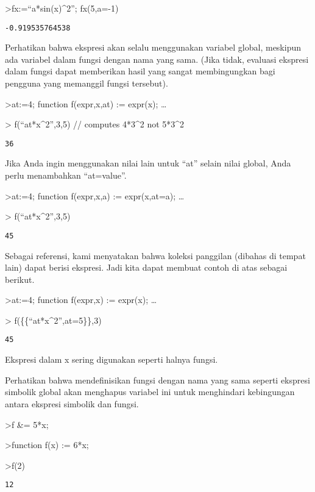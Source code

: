 \documentclass[
]{book}
\begin{document}
\textgreater fx:=``a*sin(x)\^{}2''; fx(5,a=-1)

\begin{verbatim}
-0.919535764538
\end{verbatim}

Perhatikan bahwa ekspresi akan selalu menggunakan variabel global, meskipun ada variabel dalam fungsi dengan nama yang sama. (Jika tidak, evaluasi ekspresi dalam fungsi dapat memberikan hasil yang sangat membingungkan bagi pengguna yang memanggil fungsi tersebut).

\textgreater at:=4; function f(expr,x,at) := expr(x); \ldots{}

\textgreater{} f(``at*x\^{}2'',3,5) // computes 4*3\^{}2 not 5*3\^{}2

\begin{verbatim}
36
\end{verbatim}

Jika Anda ingin menggunakan nilai lain untuk ``at'' selain nilai global, Anda perlu menambahkan ``at=value''.

\textgreater at:=4; function f(expr,x,a) := expr(x,at=a); \ldots{}

\textgreater{} f(``at*x\^{}2'',3,5)

\begin{verbatim}
45
\end{verbatim}

Sebagai referensi, kami menyatakan bahwa koleksi panggilan (dibahas di tempat lain) dapat berisi ekspresi. Jadi kita dapat membuat contoh di atas sebagai berikut.

\textgreater at:=4; function f(expr,x) := expr(x); \ldots{}

\textgreater{} f(\{\{``at*x\^{}2'',at=5\}\},3)

\begin{verbatim}
45
\end{verbatim}

Ekspresi dalam x sering digunakan seperti halnya fungsi.

Perhatikan bahwa mendefinisikan fungsi dengan nama yang sama seperti ekspresi simbolik global akan menghapus variabel ini untuk menghindari kebingungan antara ekspresi simbolik dan fungsi.

\textgreater f \&= 5*x;

\textgreater function f(x) := 6*x;

\textgreater f(2)

\begin{verbatim}
12
\end{verbatim}
\end{document}
